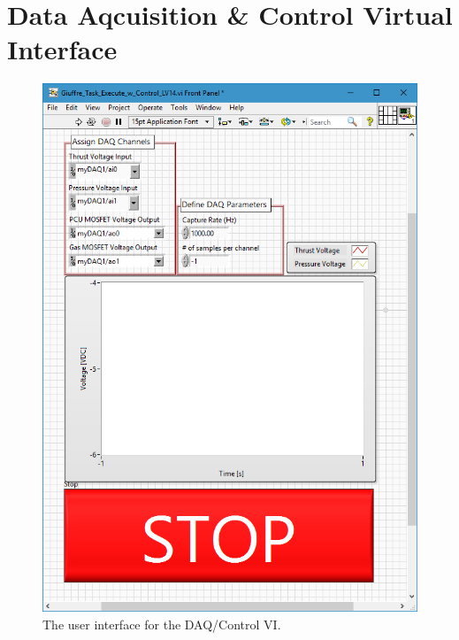 \documentclass[journal]{IEEEtran}
\begin{document}
\section{Data Aqcuisition \& Control Virtual Interface}
\begin{figure}[htp]
  \includegraphics[height=.6\vsize,keepaspectratio]{figs/VI_30Mar17_FP.png}
  \caption{The user interface for the DAQ/Control VI.\@
\label{fig:VI-frontpanel}
}
\end{figure}

%
\end{document}
